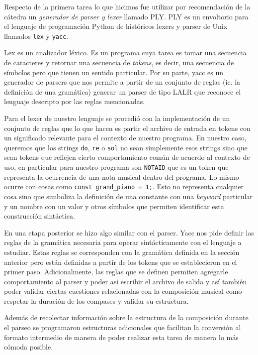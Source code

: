 Respecto de la primera tarea lo que hicimos fue utilizar por recomendación de la cátedra un \emph{generador de parser y lexer} llamado
PLY. PLY es un envoltorio para el lenguaje de programación Python de históricos lexers y parser de Unix llamados \texttt{lex} y \texttt{yacc}.

Lex es un analizador léxico. Es un programa cuya tarea es tomar una secuencia de caracteres y retornar una secuencia de \emph{tokens}, es decir,
una secuencia de símbolos pero que tienen un sentido particular. Por su parte, yacc es un generador de parsers que nos permite a partir de un
conjunto de reglas (ie. la definición de una gramática) generar un parser de tipo LALR que reconoce el lenguaje descripto por las reglas mencionadas.

Para el lexer de nuestro lenguaje se procedió con la implementación de un conjunto de reglas que lo que hacen es partir el archivo de entrada
en tokens con un significado relevante para el contexto de nuestro programa. En nuestro caso, queremos que los strings \texttt{do}, \texttt{re} o
\texttt{sol} no sean simplemente esos strings sino que sean tokens que reflejen cierto comportamiento común de acuerdo al contexto de uso, en particular
para nuestro programa son \texttt{NOTAID} que es un token que representa la ocurrencia de una nota musical dentro del programa. Lo mismo ocurre
con cosas como \texttt{const grand_piano = 1;}. Esto no representa cualquier cosa sino que simboliza la definición de una constante con una
\emph{keyword} particular y un nombre con un valor y otros símbolos que permiten identificar esta construcción sintáctica.

En una etapa posterior se hizo algo similar con el parser. Yacc nos pide definir las reglas de la gramática necesaria para operar
sintácticamente con el lenguaje a estudiar. Estas reglas se corresponden con la gramática definida en la sección anterior pero están
definidas a partir de los tokens que se establecieron en el primer paso. Adicionalmente, las reglas que se definen permiten agregarle comportamiento 
al parser y poder así escribir el archivo de salida y así también poder validar ciertas cuestiones relacionadas con la composición musical
como respetar la duración de los compases y validar su estructura.

Además de recolectar información sobre la estructura de la composición durante el parseo se programaron estructuras adicionales que facilitan la 
conversión al formato intermedio de manera de poder realizar esta tarea de manera lo más cómoda posible.

